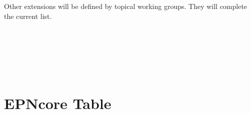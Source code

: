 \documentclass[11pt,a4paper]{ivoa}
\begin{document}
\\ 

\\

\\


Other extensions will be defined by topical working groups. They will complete the current list.

\\ 

\\

\\





\section{EPNcore Table}
\end{document}
